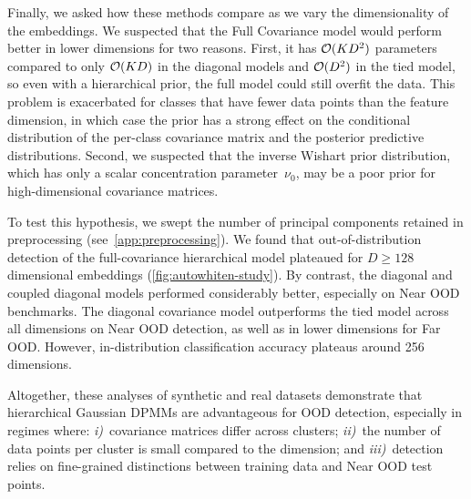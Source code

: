 

Finally, we asked how these methods compare as we vary the dimensionality of
the embeddings. We suspected that the Full Covariance model would perform
better in lower dimensions for two reasons. First, it has $\mathcal{O}(KD^2)$
parameters compared to only $\mathcal{O}(KD)$ in the diagonal models and $\mathcal{O}(D^2)$ in
the tied model, so even with a hierarchical prior, the full model could still
overfit the data. This problem is exacerbated for classes that have fewer data
points than the feature dimension, in which case the prior has a strong effect
on the conditional distribution of the per-class covariance matrix and the
posterior predictive distributions. Second, we suspected that the inverse
Wishart prior distribution, which has only a scalar concentration
parameter~$\nu_0$, may be a poor prior for high-dimensional covariance
matrices.

To test this hypothesis, we swept the number of principal components retained
in preprocessing (see~\cref{app:preprocessing}). We found that
out-of-distribution detection of the full-covariance hierarchical model
plateaued for $D \geq 128$ dimensional embeddings
(\cref{fig:autowhiten-study}). By contrast, the diagonal and coupled diagonal
models performed considerably better, especially on Near OOD benchmarks. The
diagonal covariance model outperforms the tied model across all dimensions on
Near OOD detection, as well as in lower dimensions for Far OOD. However,
in-distribution classification accuracy plateaus around 256 dimensions.

Altogether, these analyses of synthetic and real datasets demonstrate that
hierarchical Gaussian DPMMs are advantageous for OOD detection, especially in
regimes where: \textit{i)}~covariance matrices differ across clusters;
\textit{ii)}~the number of data points per cluster is small compared to the
dimension; and \textit{iii)}~detection relies on fine-grained distinctions
between training data and Near OOD test points.

